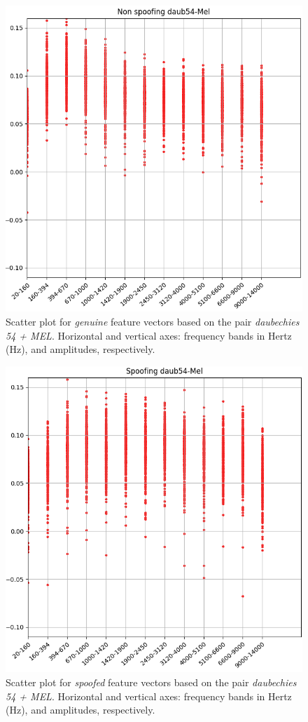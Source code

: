 \begin{figure}[H]
\centering
\includegraphics[scale=.53]{images/results/barkVersusMel/liveDaub54Mel}
\caption{Scatter plot for \textit{genuine} feature vectors  based on the pair \textit{daubechies 54 + MEL}. Horizontal and vertical axes: frequency bands in Hertz (Hz), and amplitudes, respectively.}
\label{fig:livedaub54mel}
\end{figure}
\begin{figure}[H]
\centering
\includegraphics[scale=.53]{images/results/barkVersusMel/spoofingDaub54Mel}
\caption{Scatter plot for \textit{spoofed} feature vectors  based on the pair \textit{daubechies 54 + MEL}. Horizontal and vertical axes: frequency bands in Hertz (Hz), and amplitudes, respectively.}
\label{fig:spoofingdaub54mel}
\end{figure}